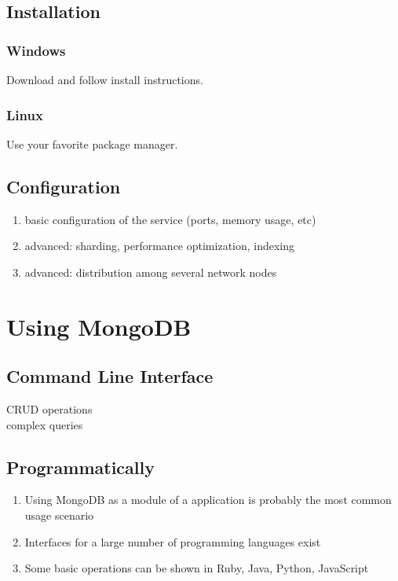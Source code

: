 \subsection{Installation}
\label{sec:installation}

\subsubsection{Windows}
\label{sec:installation-windows}
Download and follow install instructions.

\subsubsection{Linux}
\label{sec:installation-linux}
Use your favorite package manager.

\subsection{Configuration}
\label{sec:configuration}

\begin{enumerate}
  \item basic configuration of the service (ports, memory usage, etc)
  \item advanced: sharding, performance optimization, indexing
  \item advanced: distribution among several network nodes
\end{enumerate}
    
\section{Using MongoDB}
\label{sec:usage}

\subsection{Command Line Interface}
\label{sec:usage-cli}
CRUD operations\\
complex queries

\subsection{Programmatically}
\label{sec:usage-programmatically}
\begin{enumerate}
  \item Using MongoDB as a module of a application is probably the most common usage scenario
  \item Interfaces for a large number of programming languages exist
  \item Some basic operations can be shown in Ruby, Java, Python, JavaScript
\end{enumerate}



